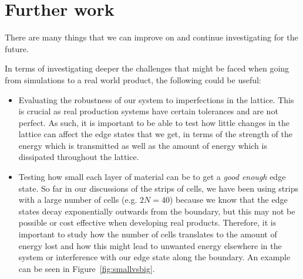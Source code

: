\section{Further work}
There are many things that we can improve on and continue investigating for the
future. 

In terms of investigating deeper the challenges that might be faced when going
from simulations to a real world product, the following could be useful:
\begin{itemize}
\item Evaluating the robustness of our system to imperfections in the lattice.
This is crucial as real production systems have certain tolerances and are not
perfect. As such, it is important to be able to test how little changes in the
lattice can affect the edge states that we get, in terms of the strength of the
energy which is transmitted as well as the amount of energy which is dissipated
throughout the lattice.

\item Testing how small each layer of material can be to get a \textit{good
enough} edge state. So far in our discussions of the strips of cells, we have
been using strips with a large number of cells (e.g. $2N=40$) because we know
that the edge states decay exponentially outwards from the boundary, but this
may not be possible or cost effective when developing real products. Therefore,
it is important to study how the number of cells translates to the amount of
energy lost and how this might lead to unwanted energy elsewhere in the system
or interference with our edge state along the boundary. An example can be seen
in Figure~\ref{fig:smallvsbig}.
\end{itemize}

